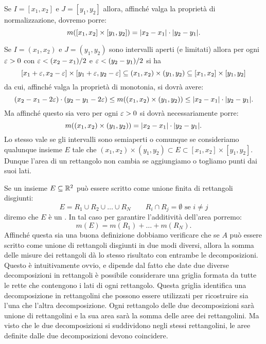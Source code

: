 Se $I=[x_1,x_2]$ e $J=[y_1,y_2]$ allora,
affinché valga la proprietà di normalizzazione,
dovremo porre:
\[
  m([x_1,x_2]\times[y_1,y_2]) = {\left|x_2-x_1\right|}\cdot{\left|y_2-y_1\right|}.
\]

Se $I=(x_1,x_2)$ e $J=(y_1,y_2)$ sono intervalli aperti (e limitati) allora
per ogni $\varepsilon>0$ con $\varepsilon<(x_2-x_1)/2$ e $\varepsilon<(y_2-y_1)/2$ si ha
\[
  [x_1+\varepsilon,x_2-\varepsilon] \times [y_1+\varepsilon,y_2-\varepsilon]
  \subseteq (x_1,x_2)\times (y_1,y_2)
  \subseteq [x_1,x_2]\times [y_1,y_2]
\]
da cui, affinché valga la proprietà di monotonia, si dovrà avere:
\[
  (x_2-x_1-2\varepsilon)\cdot (y_2-y_1-2\varepsilon) \le m((x_1,x_2)\times(y_1,y_2)) \le {\left|x_2-x_1\right|}\cdot {\left|y_2-y_1\right|}.
\]
Ma affinché questo sia vero per ogni $\varepsilon>0$ si dovrà necessariamente
porre:
\[
  m((x_1,x_2)\times(y_1,y_2)) = {\left|x_2-x_1\right|}\cdot{\left|y_2-y_1\right|}.
\]
Lo stesso vale se gli intervalli sono semiaperti o comunque
se consideriamo qualunque insieme $E$ tale che $(x_1,x_2)\times (y_1,y_2) \subset E \subset [x_1,x_2]\times[y_1,y_2]$.
Dunque l'area di un rettangolo non cambia se aggiungiamo o togliamo punti
dai suoi lati.

Se un insieme $E\subseteq {\mathbb R}^2$ può essere scritto come unione finita
di rettangoli disgiunti:
\[
  E = R_1 \cup R_2 \cup \dots \cup R_N
  \qquad
  R_i \cap R_j=\emptyset\text{ se } i\neq j
\]
diremo che $E$ è un .
In tal caso per garantire l'additività dell'area
porremo:
\[
  m(E) = m(R_1) + \dots + m(R_N).
\]
Affinché questa sia una buona definizione dobbiamo verificare che
se $A$ può essere scritto come unione di rettangoli disgiunti in due modi
diversi, allora la somma delle misure dei rettangoli dà lo stesso
risultato con entrambe le decomposizioni.
Questo è intuitivamente ovvio, e dipende dal fatto che date due
diverse decomposizioni in rettangoli è possibile considerare
una griglia formata da tutte le rette che contengono i lati di ogni rettangolo.
Questa griglia identifica una decomposizione in rettangolini che possono essere
utilizzati per ricostruire sia l'una che l'altra decomposizione.
Ogni rettangolo delle due decomposizioni sarà unione di rettangolini e la sua
area sarà la somma delle aree dei rettangolini. Ma visto che le due
decomposizioni si suddividono negli stessi rettangolini, le aree definite
dalle due decomposizioni devono coincidere.

